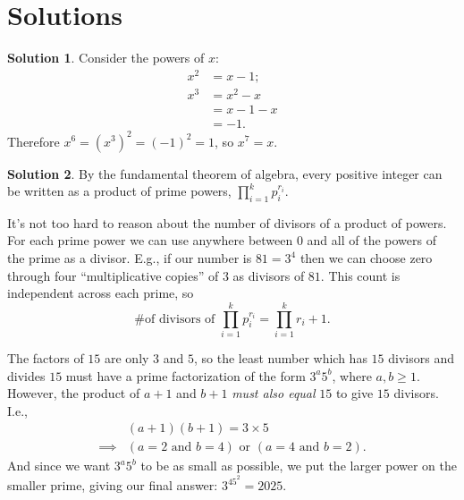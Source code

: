 \documentclass{article}
\theoremstyle{definition}
\newtheorem{sol}{Solution}
\theoremstyle{plain}
\begin{document}
\newpage

\section{Solutions}\label{appen}
\begin{sol}
Consider the powers of $x$:
\begin{align*}
x^2 &= x - 1;\\
x^3 &= x^2 - x \\
&= x - 1 - x \\
&= -1.
\end{align*}
Therefore $x^6 = {(x^3)}^2 = (-1)^2 = 1$, so $x^7 = x$.
\end{sol}

\begin{sol}
By the fundamental theorem of algebra, every positive integer can be written as a product of prime powers, $\prod_{i=1}^kp_i^{r_i}$.

It's not too hard to reason about the number of divisors of a product of powers. For each prime power we can use anywhere between 0 and all of the powers of the prime as a divisor. E.g., if our number is $81=3^4$ then we can choose zero through four ``multiplicative copies'' of $3$ as divisors of $81$. This count is independent across each prime, so
\[
\text{\# of divisors of } \prod_{i=1}^kp_i^{r_i} = \prod_{i=1}^{k}r_i+1.
\]

The factors of $15$ are only $3$ and $5$, so the least number which has $15$ divisors and divides $15$ must have a prime factorization of the form $3^a5^b$, where $a,b \geq 1$. However, the product of $a+1$ and $b+1$ \textit{must also equal} $15$ to give $15$ divisors. I.e.,
\begin{align*}
&(a+1)(b+1) = 3\times 5\\
\implies & (a = 2 \text{ and } b = 4) \text{ or } (a = 4 \text{ and } b = 2).
\end{align*}
And since we want $3^a5^b$ to be as small as possible, we put the larger power on the smaller prime, giving our final answer: $3^45^2 = 2025$.
\end{sol}
\end{document}

